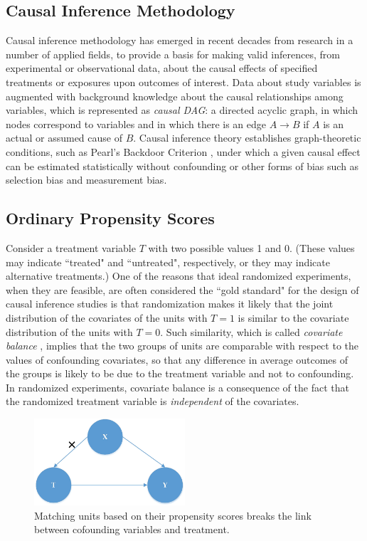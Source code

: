 \documentclass[times]{stvrauth}
\begin{document}
\subsection{Causal Inference Methodology}\label{IIIA}
Causal inference methodology \cite{Pearl2003} has emerged in recent decades from research in a number of applied fields, to provide a basis for making valid inferences, from experimental or observational data, about the causal effects of specified treatments or exposures upon outcomes of interest.  Data about study variables is augmented with background knowledge about the causal relationships among variables, which is represented as {\it causal DAG}: a directed acyclic graph, in which nodes correspond to variables and in which there is an edge $A \to B$ if $A$ is an actual or assumed cause of $B$.  Causal inference theory establishes graph-theoretic conditions, such as Pearl's Backdoor Criterion \cite{Pearl2003}, under which a given causal effect can be estimated statistically without confounding or other forms of bias such as selection bias and measurement bias.



\subsection{Ordinary Propensity Scores}\label{IIIB}
Consider a treatment variable $T$ with two possible values 1 and 0.  (These values may indicate ``treated" and ``untreated", respectively, or they may indicate alternative treatments.)  One of the reasons that ideal randomized experiments, when they are feasible, are often considered the ``gold standard" for the design of causal inference studies \cite{Grossman2005} is that randomization makes it likely that the joint distribution of the covariates of the units with $T=1$ is similar to the covariate distribution of the units with $T=0$.  Such similarity, which is called {\it covariate balance} \cite{Rosenbaum1983}, implies that the two groups of units are comparable with respect to the values of confounding covariates, so that any difference in average outcomes of the groups is likely to be due to the treatment variable and not to confounding.  In randomized experiments, covariate balance is a consequence of the fact that the randomized treatment variable is {\it independent} of the covariates.

\begin{figure}[!thpb]
\centering
\includegraphics[width=0.5\textwidth]{CausalDAG2.eps}
\caption{Matching units based on their propensity scores breaks the link between cofounding variables and treatment.}
\label{dag2}
\end{figure}
\end{document}
